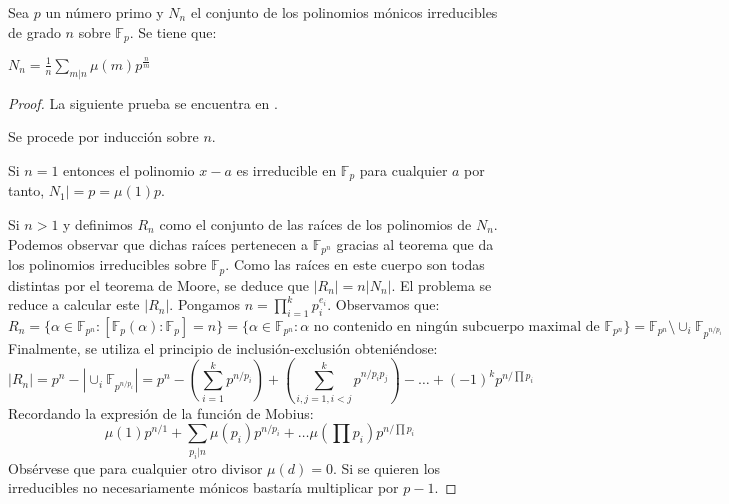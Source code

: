 \begin{theorem}
Sea $p$ un número primo y $N_n$ el conjunto de los polinomios mónicos irreducibles de grado $n$ sobre $\mathbb{F}_p$. Se tiene que:

$N_n = \frac{1}{n} \sum_{m|n} \mu(m) p^{\frac{n}{m}}$
\end{theorem}
\begin{proof}
La siguiente prueba se encuentra en \cite{counting-irreducible}. 
	
Se procede por inducción sobre $n$. 
	
Si $n = 1$ entonces el polinomio $x-a$ es irreducible en $\mathbb{F}_p$ para cualquier $a$ por tanto, $N_1| = p = \mu(1)p$. 
	
Si $n > 1$ y definimos $R_n$ como el conjunto de las raíces de los polinomios de $N_n$. Podemos observar que dichas raíces pertenecen a $\mathbb{F}_{p^n}$ gracias al teorema que da los polinomios irreducibles sobre $\mathbb{F}_p$. Como las raíces en este cuerpo son todas distintas por el teorema de Moore, se deduce que $|R_n| = n |N_n|$. El problema se reduce a calcular este $|R_n|$. Pongamos $n = \prod_{i = 1}^k p_i^{e_i}$. Observamos que: $$R_n = \{\alpha \in \mathbb{F}_{p^n}:[\mathbb{F}_p(\alpha):\mathbb{F}_p] = n \} = \{ \alpha \in \mathbb{F}_{p^n}: \alpha \text{ no    contenido en ningún subcuerpo maximal de } \mathbb{F}_{p^n} \} = \mathbb{F}_{p^n} \setminus \cup_i \mathbb{F}_{p^{n/p_i}}$$ Finalmente, se utiliza el principio de inclusión-exclusión obteniéndose: $$|R_n| = p^n - | \cup_i \mathbb{F}_{p^{n/ p_i} }| = p^n - (\sum_{i = 1}^k p^{n/p_i}) + (\sum_{i,j = 1, i < j}^k p^{n/p_i p_j}) - \ldots +(-1)^k p^{n/ \prod p_i}$$ Recordando la expresión de la función de Mobius: $$\mu(1)p^{n/1}+\sum_{p_i |n} \mu(p_i)p^{n/p_i}+ \ldots \mu(\prod p_i) p^{n/\prod p_i}$$ Obsérvese que para cualquier otro divisor $\mu(d) = 0$. Si se quieren los irreducibles no necesariamente mónicos bastaría multiplicar por $p-1$. 
	
	
\end{proof}


















